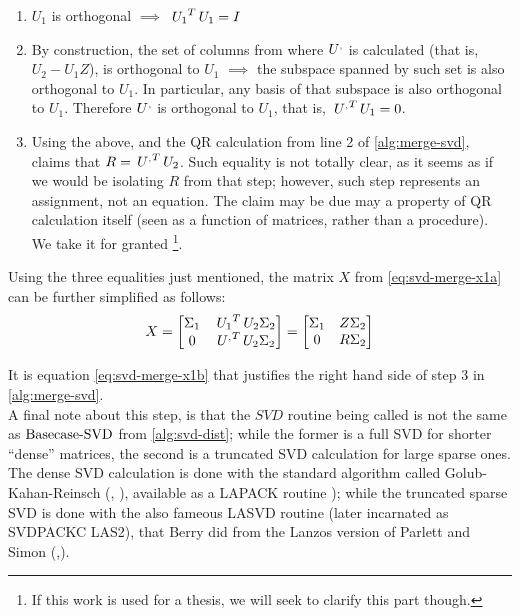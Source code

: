\begin{enumerate}
\item $U_1$ is orthogonal $\implies$ $\,{U_1}^{T}\,U_1 = I$ \\
\item By construction, the set of columns from where $\prim{U}$ is
  calculated (that is, $U_2 - U_1Z$), is orthogonal to $U_1$ $\implies$
  the subspace spanned by such set is also orthogonal to $U_1$. In
  particular, any basis of that subspace is also orthogonal to
  $U_1$. Therefore $\prim{U}$ is orthogonal to $U_1$, that is,
  $\trans{\prim{U}} U_1 = 0$. \\ 
\item Using the above, and the QR calculation from line 2 of
  \cref{alg:merge-svd}, \Rehurek claims that $R =
  \trans{\prim{U}} U_2$. Such equality is not totally clear, as it seems
  as if we would be isolating $R$ from that step; however, such step
  represents an assignment, not an equation. The claim may be due may
  a property of QR calculation itself (seen as a function of matrices, rather
  than a procedure). We take it for granted \footnote{If this work is
    used for a thesis, we will seek to clarify this part though.}.
\end{enumerate}
\hfill

Using the three equalities just mentioned, the matrix $X$ from
\cref{eq:svd-merge-x1a} can be further simplified as follows: \\

\begin{equation}
\label{eq:svd-merge-x1b}
X = 
\begin{bmatrix}
\Sigma_1 & \trans{U_1}U_2\Sigma_2 \\
0        & \trans{\prim{U}}U_2 \Sigma_2
\end{bmatrix} =
\begin{bmatrix}
\Sigma_1 & Z\Sigma_2 \\
0        & R\Sigma_2
\end{bmatrix} 
\end{equation}
\hfill

It is equation \cref{eq:svd-merge-x1b} that justifies the right hand
side of step 3 in \cref{alg:merge-svd}. \\

A final note about this step, is that the ${SVD}$ routine being called
is not the same as $\operatorname{Basecase-SVD}$ from \cref{alg:svd-dist};
while the former is a full SVD for shorter ``dense'' matrices, the
second is a truncated SVD calculation for large sparse 
ones. The dense SVD calculation is done with the standard algorithm
called Golub-Kahan-Reinsch (\cite{golub75}, \cite{golub70}), available
as a LAPACK routine \cite{lapack}); while the
truncated sparse SVD is done with the also fameous LASVD routine (later
incarnated as SVDPACKC LAS2), that Berry did from the Lanzos version
of Parlett and Simon (\cite{parlett79},\cite{simon84}). 

